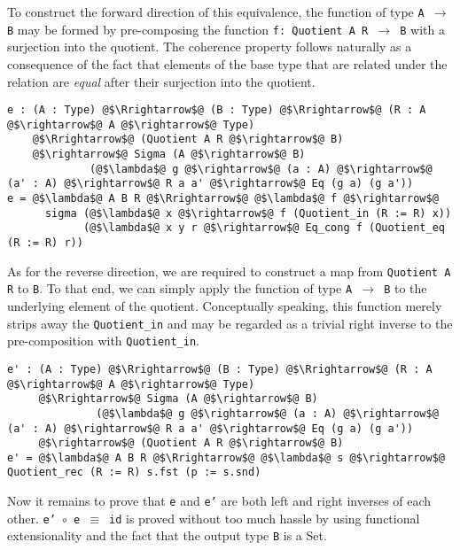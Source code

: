 \documentclass[12pt,twoside,maitrise]{dms}
\theoremstyle{definition}
\numberwithin{equation}{section}
\numberwithin{table}{chapter}
\numberwithin{figure}{chapter}
\newcommand\id[1] {\texttt{#1}}
\newcommand\fn[1] {\texttt{#1}}
\begin{document}
To construct the forward direction of this equivalence, the function of type
\fn{A $\rightarrow$ B} may be formed by pre-composing the function \fn{f:
  Quotient A R $\rightarrow$ B} with a surjection into the quotient. The
coherence property follows naturally as a consequence of the fact that elements
of the base type that are related under the relation are \emph{equal} after
their surjection into the quotient.

\begin{verbatim}
e : (A : Type) @$\Rrightarrow$@ (B : Type) @$\Rrightarrow$@ (R : A @$\rightarrow$@ A @$\rightarrow$@ Type)
    @$\Rrightarrow$@ (Quotient A R @$\rightarrow$@ B)
    @$\rightarrow$@ Sigma (A @$\rightarrow$@ B)
             (@$\lambda$@ g @$\rightarrow$@ (a : A) @$\rightarrow$@ (a' : A) @$\rightarrow$@ R a a' @$\rightarrow$@ Eq (g a) (g a'))
e = @$\lambda$@ A B R @$\Rrightarrow$@ @$\lambda$@ f @$\rightarrow$@
      sigma (@$\lambda$@ x @$\rightarrow$@ f (Quotient_in (R := R) x))
            (@$\lambda$@ x y r @$\rightarrow$@ Eq_cong f (Quotient_eq (R := R) r))
\end{verbatim}

As for the reverse direction, we are required to construct a map from
\fn{Quotient A R} to \id{B}. To that end, we can simply apply the function of
type \fn{A $\rightarrow$ B} to the underlying element of the quotient.
Conceptually speaking, this function merely strips away the \id{Quotient\_in}
and may be regarded as a trivial right inverse to the pre-composition with
\id{Quotient\_in}.

\begin{verbatim}
e' : (A : Type) @$\Rrightarrow$@ (B : Type) @$\Rrightarrow$@ (R : A @$\rightarrow$@ A @$\rightarrow$@ Type)
     @$\Rrightarrow$@ Sigma (A @$\rightarrow$@ B)
              (@$\lambda$@ g @$\rightarrow$@ (a : A) @$\rightarrow$@ (a' : A) @$\rightarrow$@ R a a' @$\rightarrow$@ Eq (g a) (g a'))
     @$\rightarrow$@ (Quotient A R @$\rightarrow$@ B)
e' = @$\lambda$@ A B R @$\Rrightarrow$@ @$\lambda$@ s @$\rightarrow$@ Quotient_rec (R := R) s.fst (p := s.snd)
\end{verbatim}

Now it remains to prove that \id{e} and \id{e'} are both left and right inverses
of each other. \fn{e' $\circ{}$ e $\equiv$ id} is proved without too much hassle
by using functional extensionality and the fact that the output type \id{B} is a
Set.
\end{document}
